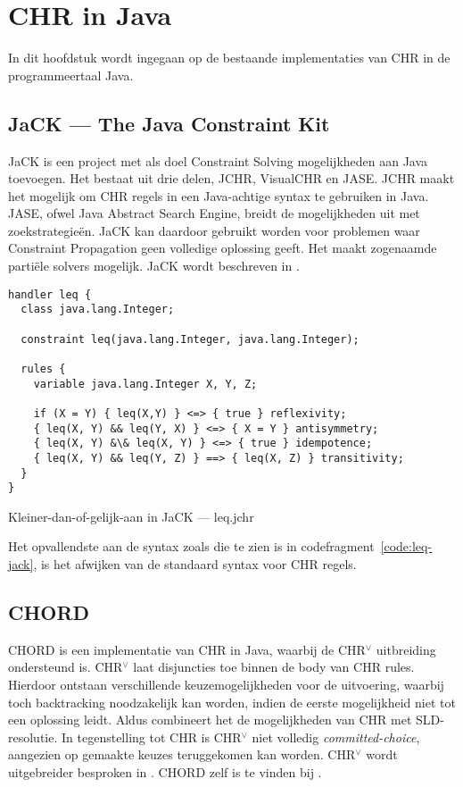 \chapter{CHR in Java} \label{chap:chr-java}

In dit hoofdstuk wordt ingegaan op de bestaande implementaties van CHR in de programmeertaal Java. 

\section{JaCK --- The Java Constraint Kit}

JaCK is een project met als doel Constraint Solving mogelijkheden aan Java toevoegen. Het bestaat uit drie delen, JCHR, VisualCHR en JASE. JCHR maakt het mogelijk om CHR regels in een Java-achtige syntax te gebruiken in Java. JASE, ofwel Java Abstract Search Engine, breidt de mogelijkheden uit met zoekstrategie\"en. JaCK kan daardoor gebruikt worden voor problemen waar Constraint Propagation geen volledige oplossing geeft. Het maakt zogenaamde parti\"ele solvers mogelijk. JaCK wordt beschreven in \cite{jack}.
\begin{exCode}[bhp]
\begin{Verbatim}[frame=single]
handler leq {
  class java.lang.Integer;
  
  constraint leq(java.lang.Integer, java.lang.Integer);
  
  rules {
    variable java.lang.Integer X, Y, Z;
    
    if (X = Y) { leq(X,Y) } <=> { true } reflexivity;
    { leq(X, Y) && leq(Y, X) } <=> { X = Y } antisymmetry;
    { leq(X, Y) &\& leq(X, Y) } <=> { true } idempotence;
    { leq(X, Y) && leq(Y, Z) } ==> { leq(X, Z) } transitivity;
  }
}
\end{Verbatim}
\caption{Kleiner-dan-of-gelijk-aan in JaCK --- leq.jchr}
\label{code:leq-jack}
\end{exCode}
Het opvallendste aan de syntax zoals die te zien is in codefragment~\ref{code:leq-jack}, is het afwijken van de standaard syntax voor CHR regels.

\section{CHORD}

CHORD is een implementatie van CHR in Java, waarbij de CHR$^\vee$ uitbreiding ondersteund is. CHR$^\vee$ laat disjuncties toe binnen de body van CHR rules. Hierdoor ontstaan verschillende keuzemogelijkheden voor de uitvoering, waarbij toch backtracking noodzakelijk kan worden, indien de eerste mogelijkheid niet tot een oplossing leidt. Aldus combineert het de mogelijkheden van CHR met SLD-resolutie. In tegenstelling tot CHR is CHR$^\vee$ niet volledig {\em committed-choice}, aangezien op gemaakte keuzes teruggekomen kan worden. CHR$^\vee$ wordt uitgebreider besproken in \cite{chrv}. CHORD zelf is te vinden bij \cite{chord}.

